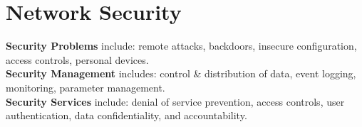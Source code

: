 \documentclass[a4paper,11pt]{article}
\begin{document}
\section{Network Security}
\textbf{Security Problems} include: remote attacks, backdoors, insecure configuration, access controls, personal devices.\\
\textbf{Security Management} includes: control \& distribution of data, event logging, monitoring, parameter management.\\
\textbf{Security Services} include: denial of service prevention, access controls, user authentication, data confidentiality, and accountability. 
\end{document}
